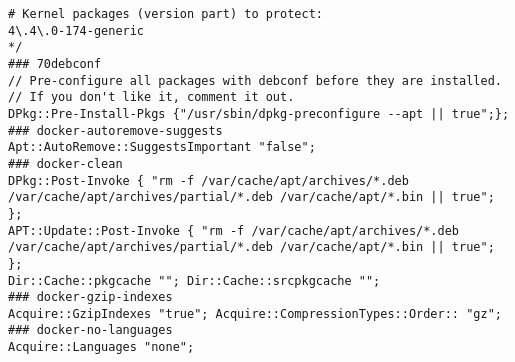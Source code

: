 \begin{verbatim}
# Kernel packages (version part) to protect:
4\.4\.0-174-generic
*/
### 70debconf
// Pre-configure all packages with debconf before they are installed.
// If you don't like it, comment it out.
DPkg::Pre-Install-Pkgs {"/usr/sbin/dpkg-preconfigure --apt || true";};
### docker-autoremove-suggests
Apt::AutoRemove::SuggestsImportant "false";
### docker-clean
DPkg::Post-Invoke { "rm -f /var/cache/apt/archives/*.deb /var/cache/apt/archives/partial/*.deb /var/cache/apt/*.bin || true"; };
APT::Update::Post-Invoke { "rm -f /var/cache/apt/archives/*.deb /var/cache/apt/archives/partial/*.deb /var/cache/apt/*.bin || true"; };
Dir::Cache::pkgcache ""; Dir::Cache::srcpkgcache "";
### docker-gzip-indexes
Acquire::GzipIndexes "true"; Acquire::CompressionTypes::Order:: "gz";
### docker-no-languages
Acquire::Languages "none";
\end{verbatim}
\endgroup
